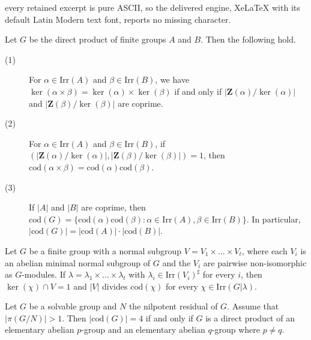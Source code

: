 \documentclass[10pt,a4paper]{amsart}
\begin{document}
every retained excerpt is pure ASCII, so the delivered engine, XeLaTeX with its default Latin Modern text font, reports no missing character.
\begin{lem}\label{lem: direct product, kernel and codegrees}
	Let $G$ be the direct product of finite groups $A$ and $B$.
	Then the following hold.
	\begin{description}
		\item[(1)] For $\alpha \in \mathrm{Irr}(A)$ and $\beta \in \mathrm{Irr}(B)$, 
		we have $\ker(\alpha\times \beta)=\ker(\alpha)\times \ker(\beta)$ if and only if $|\mathbf{Z}(\alpha)/\ker(\alpha)|$ and $|\mathbf{Z}(\beta)/\ker(\beta)|$ are coprime. 
		\item[(2)] 
		For $\alpha \in \mathrm{Irr}(A)$ and $\beta \in \mathrm{Irr}(B)$,
		if $(|\mathbf{Z}(\alpha)/\ker(\alpha)|,|\mathbf{Z}(\beta)/\ker(\beta)|)=1$,
		then $\mathrm{cod}(\alpha\times \beta)=\mathrm{cod}(\alpha)\mathrm{cod}(\beta)$.
		\item[(3)] If $|A|$ and $|B|$ are coprime, then $\mathrm{cod}(G)=\{ \mathrm{cod}(\alpha)\mathrm{cod}(\beta):\alpha \in \mathrm{Irr}(A),\beta\in \mathrm{Irr}(B) \}$.
		In particular, $|\mathrm{cod}(G)|=|\mathrm{cod}(A)|\cdot |\mathrm{cod}(B)|$.
	\end{description} 
\end{lem}

\begin{lem}\label{lem: kernel, abelian, cod}
  Let $G$ be a finite group with a normal subgroup
$V = V_{1} \times \dots \times V_{t}$,
where each $V_{i}$ is an abelian minimal normal subgroup of $G$ and
the $V_{i}$ are pairwise non-isomorphic as $G$-modules.
If $\lambda = \lambda_{1} \times \dots \times \lambda_{t}$ with
$\lambda_{i} \in \mathrm{Irr}(V_{i})^{\sharp}$ for every $i$, then
$\ker(\chi) \cap V = 1$ and $|V|$ divides $\mathrm{cod}(\chi)$ for every
$\chi \in \mathrm{Irr}(G | \lambda)$.
\end{lem}

\begin{lem}\label{lem: nilpotent}
  Let $G$ be a solvable group and $N$ the nilpotent residual of $G$.
  Assume that $|\pi(G/N)|>1$.
  Then $|\mathrm{cod}(G)|=4$ if and only if $G$ is a direct product of an elementary abelian $p$-group
  and an elementary abelian $q$-group where $p\neq q$.
\end{lem}
\end{document}
